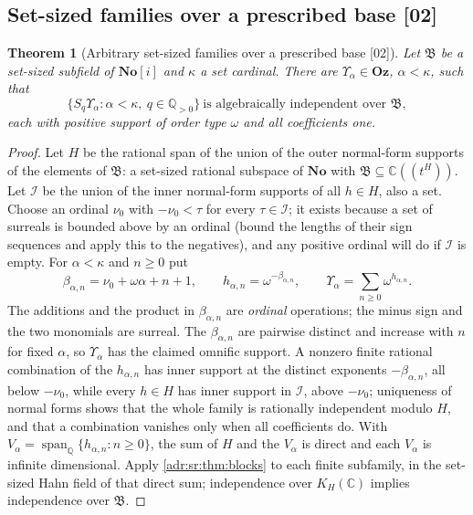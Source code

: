 \documentclass[11pt,letterpaper]{article}
\numberwithin{equation}{section}
\newtheorem{theorem}{Theorem}[section]
\theoremstyle{definition}
\theoremstyle{remark}
\newcommand{\No}{\mathbf{No}}
\newcommand{\Oz}{\mathbf{Oz}}
\newcommand{\SC}{\mathbf{No}[i]}
\newcommand{\C}{\mathbb C}
\newcommand{\Q}{\mathbb Q}
\newcommand{\src}[1]{\textup{[#1]}}%
\begin{document}
\subsection{Set-sized families over a prescribed base \src{02}}

\begin{theorem}[Arbitrary set-sized families over a prescribed base \src{02}]
\label{adr:sr:thm:kappa}
Let $\mathfrak B$ be a set-sized subfield of $\SC$ and $\kappa$ a set
cardinal. There are $\Upsilon_\alpha\in\Oz$, $\alpha<\kappa$, such that
\begin{equation}\label{adr:sr:eq:kappa}
 \{S_q\Upsilon_\alpha:\alpha<\kappa,\ q\in\Q_{>0}\}
 \ \text{is algebraically independent over }\mathfrak B,
\end{equation}
each with positive support of order type $\omega$ and all coefficients one.
\end{theorem}
\begin{proof}
Let $H$ be the rational span of the union of the outer normal-form supports of
the elements of $\mathfrak B$: a set-sized rational subspace of $\No$ with
$\mathfrak B\subseteq\C((t^H))$. Let $\mathcal I$ be the union of the inner
normal-form supports of all $h\in H$, also a set. Choose an ordinal $\nu_0$
with $-\nu_0<\tau$ for every $\tau\in\mathcal I$; it exists because a set of
surreals is bounded above by an ordinal (bound the lengths of their sign
sequences and apply this to the negatives), and any positive ordinal will do
if $\mathcal I$ is empty. For $\alpha<\kappa$ and $n\ge0$ put
\begin{equation}\label{adr:sr:eq:fresh}
 \beta_{\alpha,n}=\nu_0+\omega\alpha+n+1,\qquad
 h_{\alpha,n}=\omega^{-\beta_{\alpha,n}},\qquad
 \Upsilon_\alpha=\sum_{n\ge0}\omega^{h_{\alpha,n}}.
\end{equation}
The additions and the product in $\beta_{\alpha,n}$ are \emph{ordinal}
operations; the minus sign and the two monomials are surreal. The
$\beta_{\alpha,n}$ are pairwise distinct and increase with $n$ for fixed
$\alpha$, so $\Upsilon_\alpha$ has the claimed omnific support. A nonzero
finite rational combination of the $h_{\alpha,n}$ has inner support at the
distinct exponents $-\beta_{\alpha,n}$, all below $-\nu_0$, while every $h\in H$
has inner support in $\mathcal I$, above $-\nu_0$; uniqueness of normal forms
shows that the whole family is rationally independent modulo $H$, and that a
combination vanishes only when all coefficients do. With
$V_\alpha=\operatorname{span}_\Q\{h_{\alpha,n}:n\ge0\}$, the sum of $H$ and the
$V_\alpha$ is direct and each $V_\alpha$ is infinite dimensional. Apply
\cref{adr:sr:thm:blocks} to each finite subfamily, in the set-sized Hahn field
of that direct sum; independence over $K_H(\C)$ implies independence over
$\mathfrak B$.
\end{proof}
\end{document}
